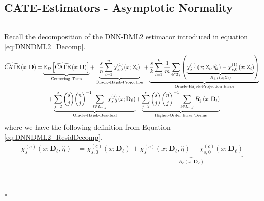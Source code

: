 \subsection{CATE-Estimators - Asymptotic Normality}
\hrule
Recall the decomposition of the DNN-DML2 estimator introduced in equation \ref{eq:DNNDML2_Decomp}.
\begin{equation}
    \begin{aligned}
        \widehat{\operatorname{CATE}}\left(x; \mathbf{D}\right)
        & = \underbrace{\mathbb{E}_{D}\left[\widehat{\operatorname{CATE}}\left(x; \mathbf{D}\right)\right]}_{\text{Centering-Term}}
        + \underbrace{\frac{s}{n}\sum_{i = 1}^{n} \chi_{s,0}^{(1)}\left(x; Z_{i}\right)}_{\text{Oracle-H\'ajek-Projection}}
        + \underbrace{\frac{s}{k} \sum_{l = 1}^{k} \frac{1}{m} \sum_{i \in \mathcal{I}_{k}}\left(\underbrace{\chi_{s}^{(1)}\left(x; Z_{i}, \widehat{\eta}_{k}\right) - \chi_{s,0}^{(1)}\left(x; Z_{i}\right)}_{R_{1,k}\left(x; Z_{i}\right)}\right)}_{\text{Oracle-H\'ajek-Projection Error}}\\
        & \quad \quad + \underbrace{\sum_{j = 2}^{s} \binom{s}{j} \binom{n}{j}^{-1}\sum_{\ell \in L_{n,j}} \chi_{s,0}^{(j)}\left(x; \mathbf{D}_{\ell}\right)}_{\text{Oracle-H\'ajek-Residual}}
         + \underbrace{\sum_{j = 2}^{s} \binom{s}{j} \binom{n}{j}^{-1}\sum_{\ell \in L_{n,j}} R_{j}\left(x; \mathbf{D}_{\ell}\right)}_{\text{Higher-Order Error Terms}}
    \end{aligned}
\end{equation}
where we have the following definition from Equation \ref{eq:DNNDML2_ResidDecomp}.
\begin{equation}
    \begin{aligned}
        \chi_{s}^{(c)}\left(x; \mathbf{D}_{\ell}, \hat{\eta}\right)
        & = \chi_{s,0}^{(c)}\left(x; \mathbf{D}_{\ell}\right) + \underbrace{\chi_{s}^{(c)}\left(x; \mathbf{D}_{\ell}, \hat{\eta}\right) - \chi_{s,0}^{(c)}\left(x; \mathbf{D}_{\ell}\right)}_{R_{c}\left(x; \mathbf{D}_{\ell}\right)}
    \end{aligned}
\end{equation}

\hrule

\begin{lem}\label{lem:ps_hajek_error}\mbox{}\\*
    
\end{lem}

